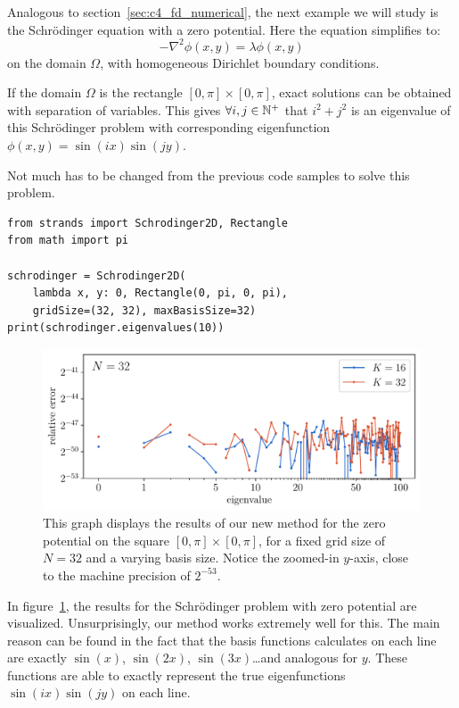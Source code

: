 Analogous to section~\ref{sec:c4_fd_numerical}, the next example we will study is the Schrödinger equation with a zero potential. Here the equation simplifies to:
$$
    -\nabla^2 \phi(x, y) = \lambda\phi(x, y)
$$
on the domain $\Omega$, with homogeneous Dirichlet boundary conditions.

If the domain $\Omega$ is the rectangle $[0, \pi] \times [0, \pi]$, exact solutions can be obtained with separation of variables. This gives $\forall i, j \in \mathbb{N}^{+}$ that $i^2 + j^2$ is an eigenvalue of this Schrödinger problem with corresponding eigenfunction $\phi(x, y) = \sin(i x)\sin(j y)$.

Not much has to be changed from the previous code samples to solve this problem.
\begin{verbatim}
from strands import Schrodinger2D, Rectangle
from math import pi

schrodinger = Schrodinger2D(
    lambda x, y: 0, Rectangle(0, pi, 0, pi),
    gridSize=(32, 32), maxBasisSize=32)
print(schrodinger.eigenvalues(10))
\end{verbatim}

\begin{figure}
    \begin{center}
        \includegraphics[width=\textwidth]{img/chapter4/nm_test_zero_rectangle.pdf}
    \end{center}
    \caption{This graph displays the results of our new method for the zero potential on the square $[0, \pi] \times [0, \pi]$, for a fixed grid size of $N = 32$ and a varying basis size. Notice the zoomed-in $y$-axis, close to the machine precision of $2^{-53}$.}
    \label{fig:c4_nm_zero_test_rectangle}
\end{figure}

In figure~\ref{fig:c4_nm_zero_test_rectangle}, the results for the Schrödinger problem with zero potential are visualized. Unsurprisingly, our method works extremely well for this. The main reason can be found in the fact that the basis functions \matslise{} calculates on each line are exactly $\sin(x)$, $\sin(2x)$, $\sin(3x)$\dots and analogous for $y$. These functions are able to exactly represent the true eigenfunctions $\sin(i x)\sin(j y)$ on each line.

